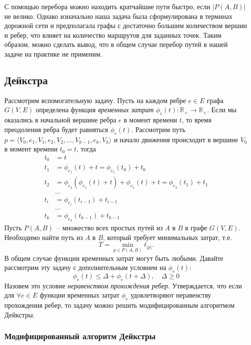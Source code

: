 \documentclass[12pt, a4paper]{article}
\begin{document}
С помощью перебора можно находить кратчайшие пути быстро, если $|P(A,B)|$ не велико. Однако изначально наша задача была сформулирована в терминах дорожной сети и предполагала графы с достаточно большим количеством вершин и ребер, что влияет на количество маршрутов для заданных точек. Таким образом, можно сделать вывод, что в общем случае перебор путей в нашей задаче на практике не применим.

\newpage
\subsection{Дейкстра}


Рассмотрим вспомогательную задачу. Пусть на каждом ребре $e \in E$ графа $G(V, E)$ определена функция \textit{временных затрат} $\phi_e(t) : \mathbb {R}_+ \rightarrow \mathbb {R}_+$. Если мы оказались в начальной вершине ребра $e$ в момент времени $t$, то время преодоления ребра будет равняться $\phi_e(t)$. Рассмотрим путь $p = \langle V_0, e_1, V_1, e_2, V_2, \dots, V_{k-1}, e_k, V_k \rangle $ и начало движения происходит в вершине $V_0$ в момент времени $t_0 = t$, тогда
\begin{align*}
t_0 & = t  \\
t_1 & = \phi_{e_1}(t) + t = \phi_{e_1}(t_0) + t_0  \\
t_2 & = \phi_{e_2}(\phi_{e_1}(t) + t) + \phi_{e_1}(t) + t = \phi_{e_2}(t_1) + t_1 \\
    & \dots \\
t_i & = \phi_{e_i}(t_{i-1}) + t_{i-1} \\
    & \dots \\
t_k & = \phi_{e_k}(t_{k-1}) + t_{k-1}
\end{align*}
Пусть $P(A, B)$~-- множество всех простых путей из $A$ в $B$ в графе $G(V, E)$. Необходимо найти путь из $A$ в $B$, который требует минимальных затрат, т.е. 
$$T = \min_{p \in P(A, B)} t_{|p|}.$$
В общем случае функции временных затрат могут быть любыми. Давайте рассмотрим эту задачу с дополнительным условием на $\phi_e(t):$
$$ \phi_e(t) \leq \Delta + \phi_e(t + \Delta), \quad \Delta \ge 0$$
Назовем это условие \textit{неравенством прохождения ребер}. Утверждается, что если для $\forall e \in E$ функции временных затрат $\phi_e$ удовлетворяют неравенству прохождения ребер, то задачу можно решить модифицированным алгоритмом Дейкстры.

\subsubsection{Модифицированный алгоритм Дейкстры}
\end{document}
